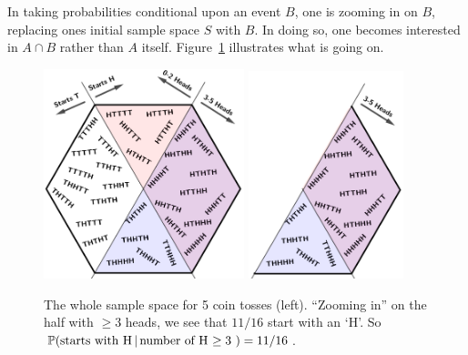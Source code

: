 In taking probabilities conditional upon an event $B$, one is zooming in on $B$, replacing ones initial sample space $S$ with $B$. In doing so, one becomes interested in $A \cap B$ rather than $A$ itself.  Figure~\ref{condo} illustrates what is going on. 

\begin{figure}[h] \centering
\includegraphics[width=0.52\textwidth]{existing-materials/ProbabilityNotes_23-24/images/condo0.png}\qquad
\includegraphics[width=0.4\textwidth]{existing-materials/ProbabilityNotes_23-24/images/condo1.png}
\caption{\label{condo} The whole sample space for 5 coin tosses (left). ``Zooming in'' on the half with $\geq 3$ heads, we see that $11/16$ start with an `H'. So ${\mathbb P}(\text{starts with H} \, | \, \text{number of H $\geq 3$ }) = 11/16$.} 
\end{figure}

